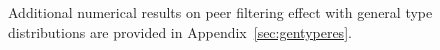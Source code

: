 
Additional numerical results on peer filtering effect with general type distributions are provided in Appendix~\ref{sec:gentyperes}.


